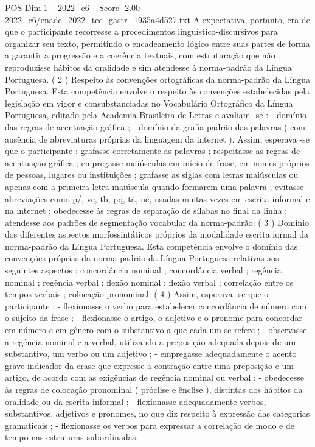 \begin{textsample}{POS Dim 1 – 2022\_c6 – Score -2.00 – 2022\_c6/enade\_2022\_tec\_gastr\_1935a4d527.txt}
A expectativa, portanto, era de que o participante recorresse a procedimentos linguístico-discursivos para organizar seu texto, permitindo o encadeamento lógico entre suas partes de forma a garantir a progressão e a coerência textuais, com estruturação que não reproduzisse hábitos da oralidade e sim atendesse à norma-padrão da Língua Portuguesa. ( 2 ) Respeito às convenções ortográficas da norma-padrão da Língua Portuguesa.
Esta competência envolve o respeito às convenções estabelecidas pela legislação em vigor e consubstanciadas no Vocabulário Ortográfico da Língua Portuguesa, editado pela Academia Brasileira de Letras e avaliam -se : - domínio das regras de acentuação gráfica ; - domínio da grafia padrão das palavras ( com ausência de abreviaturas próprias da linguagem da internet ).
Assim, esperava -se que o participante : grafasse corretamente as palavras ; respeitasse as regras de acentuação gráfica ; empregasse maiúsculas em início de frase, em nomes próprios de pessoas, lugares ou instituições ; grafasse as siglas com letras maiúsculas ou apenas com a primeira letra maiúscula quando formarem uma palavra ; evitasse abreviações como p/, vc, tb, pq, tá, né, usadas muitas vezes em escrita informal e na internet ; obedecesse às regras de separação de sílabas no final da linha ; atendesse aos padrões de segmentação vocabular da norma-padrão. ( 3 ) Domínio dos diferentes aspectos morfossintáticos próprios da modalidade escrita formal da norma-padrão da Língua Portuguesa.
Esta competência envolve o domínio das convenções próprias da norma-padrão da Língua Portuguesa relativas aos seguintes aspectos : concordância nominal ; concordância verbal ; regência nominal ; regência verbal ; flexão nominal ; flexão verbal ; correlação entre os tempos verbais ; colocação pronominal. ( 4 ) Assim, esperava -se que o participante : - flexionasse o verbo para estabelecer concordância de número com o sujeito da frase ; - flexionasse o artigo, o adjetivo e o pronome para concordar em número e em gênero com o substantivo a que cada um se refere ; - observasse a regência nominal e a verbal, utilizando a preposição adequada depois de um substantivo, um verbo ou um adjetivo ; - empregasse adequadamente o acento grave indicador da crase que expresse a contração entre uma preposição e um artigo, de acordo com as exigências de regência nominal ou verbal ; - obedecesse às regras de colocação pronominal ( próclise e ênclise ), distintas dos hábitos da oralidade ou da escrita informal ; - flexionasse adequadamente verbos, substantivos, adjetivos e pronomes, no que diz respeito à expressão das categorias gramaticais ; - flexionasse os verbos para expressar a correlação de modo e de tempo nas estruturas subordinadas.

\end{textsample}
